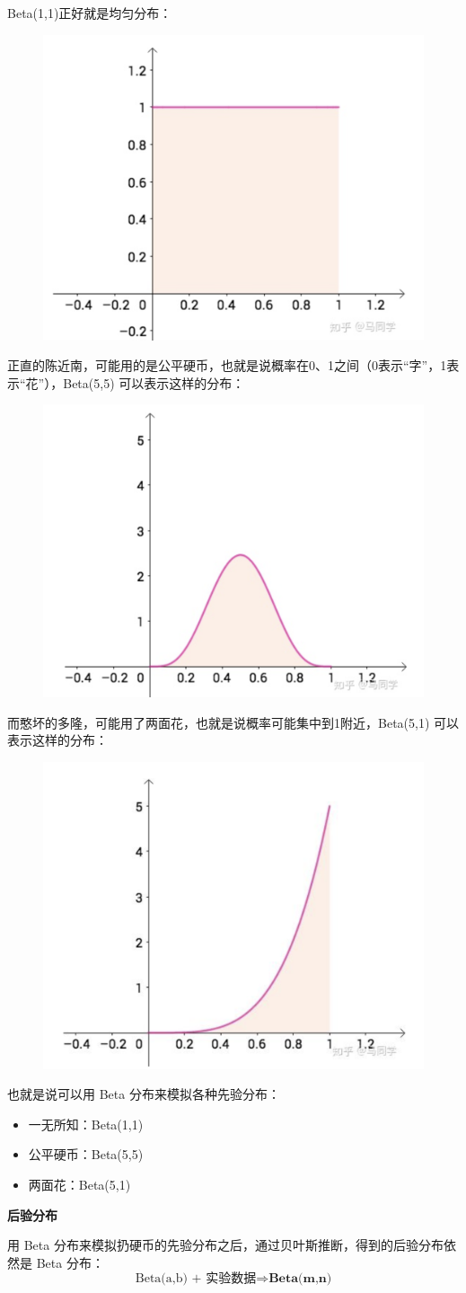 \documentclass[12pt]{article}
\begin{document}
Beta(1,1)正好就是均匀分布：
\begin{figure}[H]
  \centering
  \includegraphics[width=.3\textwidth]{fig/Beta_Distribution_Ma_Example_2.png} 
\end{figure}

正直的陈近南，可能用的是公平硬币，也就是说概率在0、1之间（0表示“字”，1表示“花”），Beta(5,5) 可以表示这样的分布：
\begin{figure}[H]
  \centering
  \includegraphics[width=.3\textwidth]{fig/Beta_Distribution_Ma_Example_3.png} 
\end{figure}

而憨坏的多隆，可能用了两面花，也就是说概率可能集中到1附近，Beta(5,1) 可以表示这样的分布：
\begin{figure}[H]
  \centering
  \includegraphics[width=.3\textwidth]{fig/Beta_Distribution_Ma_Example_4.png} 
\end{figure}

也就是说可以用 Beta 分布来模拟各种先验分布：
\begin{itemize}
    \item 一无所知：Beta(1,1)
    \item 公平硬币：Beta(5,5)
    \item 两面花：Beta(5,1)
\end{itemize}

\textbf{后验分布}

用 Beta 分布来模拟扔硬币的先验分布之后，通过贝叶斯推断，得到的后验分布依然是 Beta 分布：
$$
\text{Beta(a,b) + 实验数据} \Rightarrow \textbf{Beta(m,n)} 
$$
\end{document}
